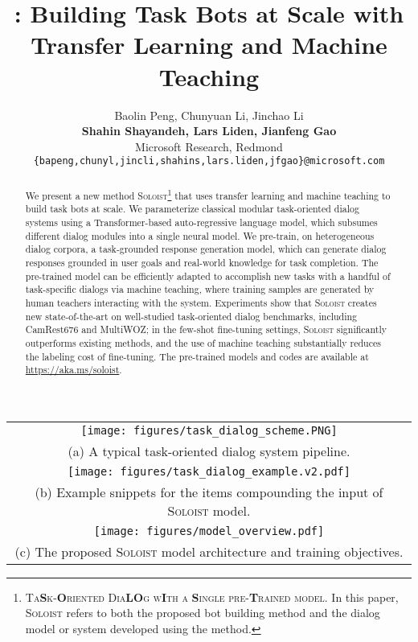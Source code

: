 \documentclass[11pt,a4paper]{article}
\title{\model{}: Building Task Bots at Scale with \\ Transfer Learning and Machine Teaching}
\author{Baolin Peng, Chunyuan Li, Jinchao Li \\
{\bf Shahin Shayandeh, Lars Liden, Jianfeng Gao} \\
  Microsoft Research, Redmond \\
  \texttt{\{bapeng,chunyl,jincli,shahins,lars.liden,jfgao\}@microsoft.com}
  }
\date{}
\newcommand{\model}{\textsc{Soloist}}
\newcommand{\longname}{\textsc{Ta\textbf{S}k-\textbf{O}riented Dia\textbf{LO}g w\textbf{I}th a \textbf{S}ingle pre-\textbf{T}rained model}}
\begin{document}
\maketitle
\begin{abstract}
We present a new method \model{}\footnote{\longname{}. In this paper, \model{} refers to both the proposed bot building method and the dialog model or system developed using the method.} that uses transfer learning and machine teaching to build task bots at scale. 
We parameterize classical modular task-oriented dialog systems using a Transformer-based auto-regressive language model, which subsumes different dialog modules into a single neural model.
We pre-train, on heterogeneous dialog corpora, a task-grounded response generation model, which can generate dialog responses grounded in user goals and real-world knowledge for task completion. 
The pre-trained model can be efficiently adapted to accomplish new tasks with a handful of task-specific dialogs via machine teaching,
where training
samples are generated by human teachers interacting with the system.
Experiments show that 
 \model{} creates new state-of-the-art on well-studied task-oriented dialog benchmarks, including CamRest676 and MultiWOZ;
 in the few-shot fine-tuning settings, \model{} significantly
outperforms existing methods, and 
 the use of machine teaching substantially reduces the labeling cost of fine-tuning. The pre-trained models and codes are available at \url{https://aka.ms/soloist}.
\end{abstract}
 

\begin{figure*}[t!]
\centering
\begin{tabular}{c}
\texttt{[image: figures/task\_dialog\_scheme.PNG]}\\
(a) A typical task-oriented dialog system pipeline. \vspace{2mm}\\
\texttt{[image: figures/task\_dialog\_example.v2.pdf]}\\
(b) Example snippets for the items compounding the input of \model{} model. \vspace{2mm} \\
\texttt{[image: figures/model\_overview.pdf]}\\
(c) The proposed \model{} model architecture and training objectives.
\end{tabular}
\caption{Illustration of a traditional modular task-oriented dialog system, an example for the model input, and the proposed model. The  \model{} solution utilizes a single neural auto-regressive model in (c) to paramterize the sequential dialog pipeline in (a), with input sequence represented in (b). Different from GPT-2, the \model{} model learns to ground response generation in user goals and database/knowledge.}


\label{fig:task_dialog_scheme}
\end{figure*}
\end{document}
